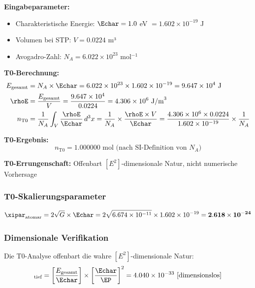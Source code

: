 	\textbf{Eingabeparameter:}
	\begin{itemize}
		\item Charakteristische Energie: $\Echar = 1.0$ eV $= 1.602 \times 10^{-19}$ J
		\item Volumen bei STP: $V = 0.0224$ m³
		\item Avogadro-Zahl: $N_A = 6.022 \times 10^{23}$ mol$^{-1}$
	\end{itemize}
	
	\textbf{T0-Berechnung:}
	\begin{align}
		E_{\text{gesamt}} &= N_A \times \Echar = 6.022 \times 10^{23} \times 1.602 \times 10^{-19} = 9.647 \times 10^{4} \text{ J} \\
		\rhoE &= \frac{E_{\text{gesamt}}}{V} = \frac{9.647 \times 10^{4}}{0.0224} = 4.306 \times 10^{6} \text{ J/m}^3 \\
		n_{\text{T0}} &= \frac{1}{N_A} \int_V \frac{\rhoE}{\Echar} \, d^3x = \frac{1}{N_A} \times \frac{\rhoE \times V}{\Echar} = \frac{4.306 \times 10^{6} \times 0.0224}{1.602 \times 10^{-19}} \times \frac{1}{N_A}
	\end{align}
	
	\textbf{T0-Ergebnis:}
	\begin{equation}
		\boxed{n_{\text{T0}} = 1.000000 \text{ mol (nach SI-Definition von } N_A\text{)}}
		\label{eq:mol_t0_ergebnis}
	\end{equation}
	
	\textbf{T0-Errungenschaft:} Offenbart $[E^2]$-dimensionale Natur, nicht numerische Vorhersage
	
	\subsubsection{T0-Skalierungsparameter}
	\label{subsubsec:mol_skalierungsparameter}
	
	\begin{equation}
		\xipar_{\text{atomar}} = 2\sqrt{G} \times \Echar = 2\sqrt{6.674 \times 10^{-11}} \times 1.602 \times 10^{-19} = \mathbf{2.618 \times 10^{-24}}
		\label{eq:xi_atomar_berechnet}
	\end{equation}
	
	\subsubsection{Dimensionale Verifikation}
	\label{subsubsec:mol_dimensionale_verifikation}
	
	Die T0-Analyse offenbart die wahre $[E^2]$-dimensionale Natur:
	\begin{equation}
		[n_{\text{T0}}]_{\text{tief}} = \left[\frac{E_{\text{gesamt}}}{\Echar}\right] \times \left[\frac{\Echar}{\EP}\right]^2 = 4.040 \times 10^{-33} \text{ [dimensionslos]}
		\label{eq:mol_e2_dimension}
	\end{equation}
	
